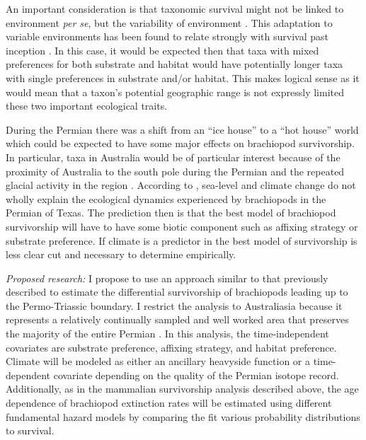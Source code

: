 \documentclass[12pt,letterpaper]{article}
\begin{document}
An important consideration is that taxonomic survival might not be linked to environment \textit{per se}, but the variability of environment \citep{Foote2013,Heim2011,Liow2007b}. This adaptation to variable environments has been found to relate strongly with survival past inception \citep{Foote2013}. In this case, it would be expected then that taxa with mixed preferences for both substrate and habitat would have potentially longer taxa with single preferences in substrate and/or habitat. This makes logical sense as it would mean that a taxon's potential geographic range is not expressly limited these two important ecological traits. 

During the Permian there was a shift from an ``ice house'' to a ``hot house'' world \citep{Fielding2006,Birgenheier2010,Jones2006,Powell2007} which could be expected to have some major effects on brachiopod survivorship. In particular, taxa in Australia would be of particular interest because of the proximity of Australia to the south pole during the Permian and the repeated glacial activity in the region \citep{Fielding2006,Birgenheier2010,Jones2006}. According to \citet{Olszewski2004}, sea-level and climate change do not wholly explain the ecological dynamics experienced by brachiopods in the Permian of Texas. The prediction then is that the best model of brachiopod survivorship will have to have some biotic component such as affixing strategy or substrate preference. If climate is a predictor in the best model of survivorship is less clear cut and necessary to determine empirically.


\textit{Proposed research:}
I propose to use an approach similar to that previously described to estimate the differential survivorship of brachiopods leading up to the Permo-Triassic boundary. I restrict the analysis to Australiasia because it represents a relatively continually sampled and well worked area that preserves the majority of the entire Permian \citep{Clapham2012,Clapham2008a,Waterhouse1987,Archbold1995}. In this analysis, the time-independent covariates are substrate preference, affixing strategy, and habitat preference. Climate will be modeled as either an ancillary heavyside function or a time-dependent covariate depending on the quality of the Permian isotope record. Additionally, as in the mammalian survivorship analysis described above, the age dependence of brachiopod extinction rates will be estimated using different fundamental hazard models by comparing the fit various probability distributions to survival.
\end{document}

